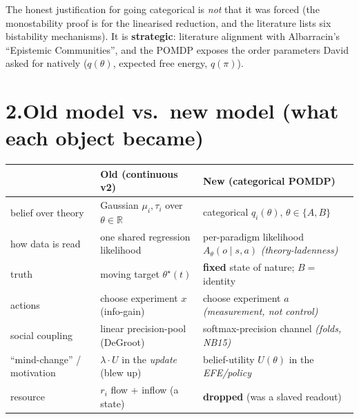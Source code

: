 \documentclass[11pt,a4paper]{article}
\begin{document}
\noindent The honest justification for going categorical is \emph{not} that it
was forced (the monostability proof is for the linearised reduction, and the
literature lists six bistability mechanisms). It is \textbf{strategic}:
literature alignment with Albarracin's ``Epistemic Communities'', and the POMDP
exposes the order parameters David asked for natively ($q(\theta)$, expected
free energy, $q(\pi)$).

\section*{2.\quad Old model vs.\ new model (what each object became)}
\begin{center}
\renewcommand{\arraystretch}{1.25}
\begin{tabular}{@{}p{4.3cm} p{5.0cm} p{5.0cm}@{}}
\toprule
 & \textbf{Old (continuous v2)} & \textbf{New (categorical POMDP)} \\
\midrule
belief over theory & Gaussian $\mu_i,\tau_i$ over $\theta\in\mathbb{R}$
   & categorical $q_i(\theta)$, $\theta\in\{A,B\}$ \\
how data is read & one shared regression likelihood
   & per-paradigm likelihood $A_\theta(o\mid s,a)$ \emph{(theory-ladenness)} \\
truth & moving target $\theta^\star(t)$
   & \textbf{fixed} state of nature; $B=$ identity \\
actions & choose experiment $x$ (info-gain)
   & choose experiment $a$ \emph{(measurement, not control)} \\
social coupling & linear precision-pool (DeGroot)
   & softmax-precision channel \emph{(folds, NB15)} \\
``mind-change'' / motivation & $\lambda\!\cdot\!U$ in the \emph{update} (blew up)
   & belief-utility $U(\theta)$ in the \emph{EFE/policy} \\
resource & $r_i$ flow + inflow (a state)
   & \textcolor{dropped}{\textbf{dropped}} (was a slaved readout) \\
\bottomrule
\end{tabular}
\end{center}

\end{document}

